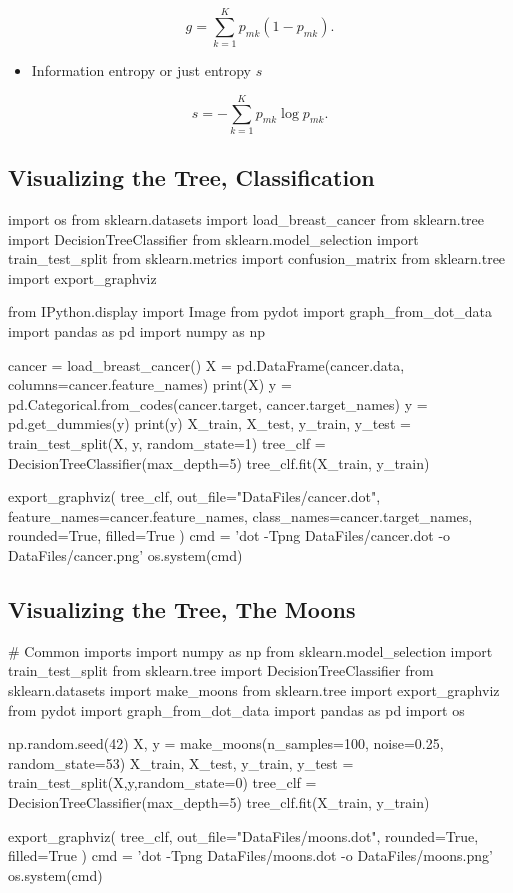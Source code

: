 \documentclass[%
oneside,                 %
final,                   %
10pt]{article}
\begin{document}
\noindent
\[
g = \sum_{k=1}^K p_{mk}(1-p_{mk}).
\]
\begin{itemize}
\item Information entropy or just entropy $s$
\end{itemize}

\noindent
\[
s = -\sum_{k=1}^K p_{mk}\log{p_{mk}}.
\]


\subsection{Visualizing the Tree, Classification}
\bpycod
import os
from sklearn.datasets import load_breast_cancer
from sklearn.tree import DecisionTreeClassifier
from sklearn.model_selection import train_test_split
from sklearn.metrics import confusion_matrix
from sklearn.tree import export_graphviz

from IPython.display import Image 
from pydot import graph_from_dot_data
import pandas as pd
import numpy as np


cancer = load_breast_cancer()
X = pd.DataFrame(cancer.data, columns=cancer.feature_names)
print(X)
y = pd.Categorical.from_codes(cancer.target, cancer.target_names)
y = pd.get_dummies(y)
print(y)
X_train, X_test, y_train, y_test = train_test_split(X, y, random_state=1)
tree_clf = DecisionTreeClassifier(max_depth=5)
tree_clf.fit(X_train, y_train)

export_graphviz(
    tree_clf,
    out_file="DataFiles/cancer.dot",
    feature_names=cancer.feature_names,
    class_names=cancer.target_names,
    rounded=True,
    filled=True
)
cmd = 'dot -Tpng DataFiles/cancer.dot -o DataFiles/cancer.png'
os.system(cmd)
\epycod

\subsection{Visualizing the Tree, The Moons}
\bpycod
# Common imports
import numpy as np
from sklearn.model_selection import  train_test_split 
from sklearn.tree import DecisionTreeClassifier
from sklearn.datasets import make_moons
from sklearn.tree import export_graphviz
from pydot import graph_from_dot_data
import pandas as pd
import os

np.random.seed(42)
X, y = make_moons(n_samples=100, noise=0.25, random_state=53)
X_train, X_test, y_train, y_test = train_test_split(X,y,random_state=0)
tree_clf = DecisionTreeClassifier(max_depth=5)
tree_clf.fit(X_train, y_train)

export_graphviz(
    tree_clf,
    out_file="DataFiles/moons.dot",
    rounded=True,
    filled=True
)
cmd = 'dot -Tpng DataFiles/moons.dot -o DataFiles/moons.png'
os.system(cmd)
\epycod
\end{document}
